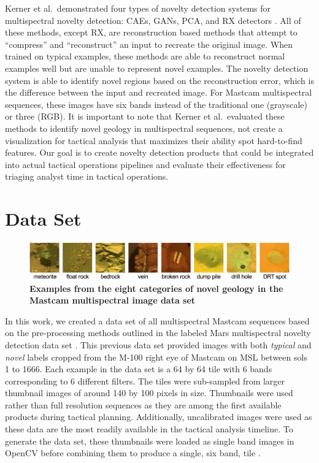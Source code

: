 Kerner et al.~demonstrated four types of novelty detection systems for multispectral novelty detection: CAEs, GANs, PCA, and RX detectors \cite{kerner2020comparison}. 
All of these methods, except RX, are reconstruction based methods that attempt to ``compress'' and ``reconstruct'' an input to recreate the original image. 
When trained on typical examples, these methods are able to reconstruct normal examples well but are unable to represent novel examples.
The novelty detection system is able to identify novel regions based on the reconstruction error, which is the difference between the input and recreated image.
For Mastcam multispectral sequences, these images have six bands instead of the traditional one (grayscale) or three (RGB). 
It is important to note that Kerner et al.~evaluated these methods to identify novel geology in multispectral sequences, not create a visualization for tactical analysis that maximizes their ability spot hard-to-find features. 
Our goal is to create novelty detection products that could be integrated into actual tactical operations pipelines and evaluate their effectiveness for triaging analyst time in tactical operations.

\section{Data Set}
\begin{figure}
\centering
\includegraphics[width=\linewidth]{figs/1/categories.png}
\caption[Novel Geology Categories for Mastcam Multispectral Images]{\textbf{Examples from the eight categories of novel geology in the Mastcam multispectral image data set \protect\cite{kerner_data}} }
\label{chap1/fig:NovelCategories}
\end{figure}

In this work, we created a data set of all multispectral Mastcam sequences based on the pre-processing methods outlined in the labeled Mars multispectral novelty detection data set \cite{kerner_data}.
This previous data set provided images with both \textit{typical} and \textit{novel} labels cropped from the M-100 right eye of Mastcam on MSL between sols 1 to 1666.
Each example in the data set is a 64 by 64 tile with 6 bands corresponding to 6 different filters.
The tiles were sub-sampled from larger thumbnail images of around 140 by 100 pixels in size. 
Thumbnails were used rather than full resolution sequences as they are among the first available products during tactical planning. 
Additionally, uncalibrated images were used as these data are the most readily available in the tactical analysis timeline. 
To generate the data set, these thumbnails were loaded as single band images in OpenCV before combining them to produce a single, six band, tile \cite{opencv_library}.

